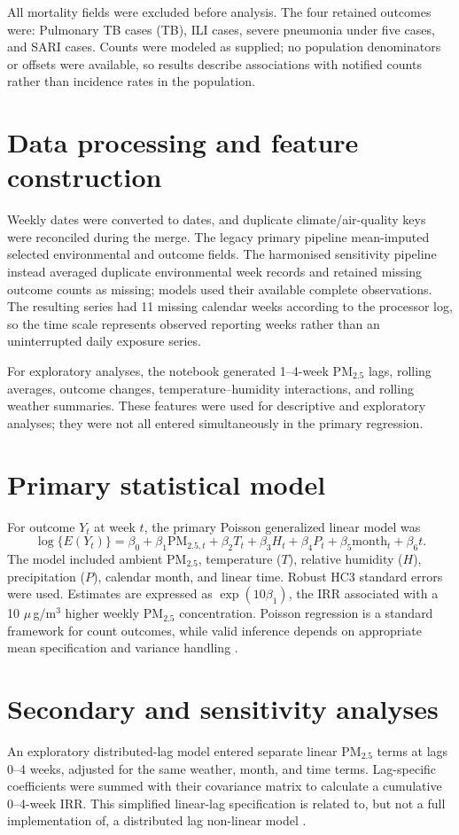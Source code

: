 \documentclass[12pt,a4paper]{report}
\newcommand{\pmfive}{PM$_{2.5}$}
\newcommand{\ugm}{\ensuremath{\mu}\,g/m$^3$}
\begin{document}
All mortality fields were excluded before analysis. The four retained outcomes were: Pulmonary TB cases (TB), ILI cases, severe pneumonia under five cases, and SARI cases. Counts were modeled as supplied; no population denominators or offsets were available, so results describe associations with notified counts rather than incidence rates in the population.

\section{Data processing and feature construction}
Weekly dates were converted to dates, and duplicate climate/air-quality keys were reconciled during the merge. The legacy primary pipeline mean-imputed selected environmental and outcome fields. The harmonised sensitivity pipeline instead averaged duplicate environmental week records and retained missing outcome counts as missing; models used their available complete observations. The resulting series had 11 missing calendar weeks according to the processor log, so the time scale represents observed reporting weeks rather than an uninterrupted daily exposure series.

For exploratory analyses, the notebook generated 1--4-week \pmfive{} lags, rolling averages, outcome changes, temperature--humidity interactions, and rolling weather summaries. These features were used for descriptive and exploratory analyses; they were not all entered simultaneously in the primary regression.

\section{Primary statistical model}
For outcome $Y_t$ at week $t$, the primary Poisson generalized linear model was
\[
\log\{E(Y_t)\}=\beta_0+\beta_1\mathrm{PM}_{2.5,t}+\beta_2T_t+\beta_3H_t+\beta_4P_t+\beta_5\mathrm{month}_t+\beta_6t.
\]
The model included ambient \pmfive{}, temperature ($T$), relative humidity ($H$), precipitation ($P$), calendar month, and linear time. Robust HC3 standard errors were used. Estimates are expressed as $\exp(10\beta_1)$, the IRR associated with a 10 \ugm{} higher weekly \pmfive{} concentration. Poisson regression is a standard framework for count outcomes, while valid inference depends on appropriate mean specification and variance handling \parencite{CameronTrivedi2013}.

\section{Secondary and sensitivity analyses}
An exploratory distributed-lag model entered separate linear \pmfive{} terms at lags 0--4 weeks, adjusted for the same weather, month, and time terms. Lag-specific coefficients were summed with their covariance matrix to calculate a cumulative 0--4-week IRR. This simplified linear-lag specification is related to, but not a full implementation of, a distributed lag non-linear model \parencite{Gasparrini2010}.
\end{document}
